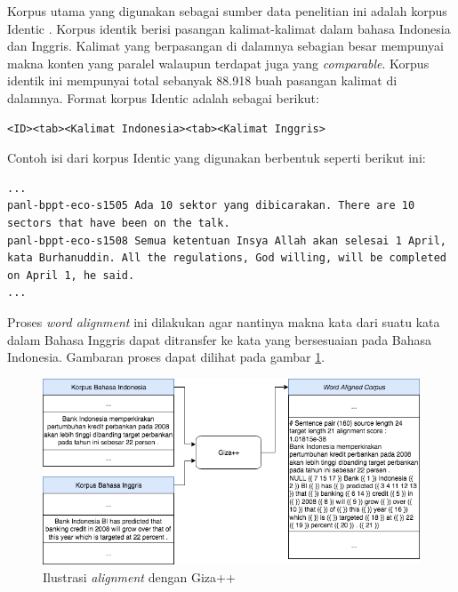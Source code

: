 Korpus utama yang digunakan sebagai sumber data penelitian ini adalah korpus Identic \citep{larasati2012identic}. Korpus identik berisi pasangan kalimat-kalimat dalam bahasa Indonesia dan Inggris. Kalimat yang berpasangan di dalamnya sebagian besar mempunyai makna konten yang paralel walaupun terdapat juga yang \textit{comparable}. Korpus identik ini mempunyai total sebanyak 88.918 buah pasangan kalimat di dalamnya. Format korpus Identic adalah sebagai berikut:
\begin{lstlisting}
<ID><tab><Kalimat Indonesia><tab><Kalimat Inggris>
\end{lstlisting}
\clearpage
Contoh isi dari korpus Identic yang digunakan berbentuk seperti berikut ini:
\begin{lstlisting}[backgroundcolor = \color{white}]
...
panl-bppt-eco-s1505	Ada 10 sektor yang dibicarakan.	There are 10 sectors that have been on the talk.
panl-bppt-eco-s1508	Semua ketentuan Insya Allah akan selesai 1 April, kata Burhanuddin.	All the regulations, God willing, will be completed on April 1, he said.
...
\end{lstlisting}


Proses \textit{word alignment} ini dilakukan agar nantinya makna kata dari suatu kata dalam Bahasa Inggris dapat ditransfer ke kata yang bersesuaian pada Bahasa Indonesia. Gambaran proses dapat dilihat pada gambar \ref{fig:giza-aligning}.

\begin{figure}
	\centering
	\includegraphics[width=1\linewidth]{adit_pics/giza-process.png}
	\caption{Ilustrasi \textit{alignment} dengan Giza++}
	\label{fig:giza-aligning}
\end{figure}

